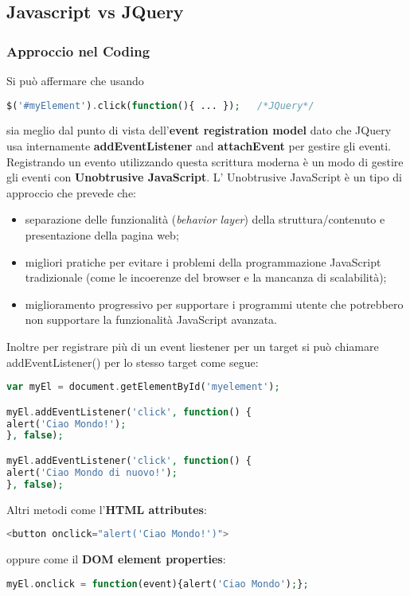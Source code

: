 \subsection{Javascript vs JQuery}

\subsubsection{Approccio nel Coding}
Si può affermare che usando 
\begin{lstlisting}[language=PHP]
$('#myElement').click(function(){ ... });	/*JQuery*/
\end{lstlisting}
sia meglio dal punto di vista dell'\textbf{event registration model} dato che JQuery usa internamente \textbf{addEventListener} and \textbf{attachEvent} per gestire gli eventi. \newline
Registrando  un evento utilizzando questa scrittura moderna è un modo di gestire gli eventi con \textbf{Unobtrusive JavaScript}. \newline
L' Unobtrusive JavaScript è un tipo di approccio che prevede che:
\begin{itemize}
\item separazione delle funzionalità (\textit{behavior layer}) della struttura/contenuto e presentazione della pagina web;
\item migliori pratiche per evitare i problemi della programmazione JavaScript tradizionale (come le incoerenze del browser e la mancanza di scalabilità);
\item miglioramento progressivo per supportare i programmi utente che potrebbero non supportare la funzionalità JavaScript avanzata.
\end{itemize}
Inoltre per registrare più di un event liestener per un target si può chiamare addEventListener() per lo stesso target come segue:
\begin{lstlisting}[language=PHP]
var myEl = document.getElementById('myelement');

myEl.addEventListener('click', function() {
alert('Ciao Mondo!');
}, false);

myEl.addEventListener('click', function() {
alert('Ciao Mondo di nuovo!');
}, false);
\end{lstlisting}

Altri metodi come l'\textbf{HTML attributes}:
\begin{lstlisting}[language=PHP]
<button onclick="alert('Ciao Mondo!')">
\end{lstlisting}
oppure come il \textbf{DOM element properties}:
\begin{lstlisting}[language=PHP]
myEl.onclick = function(event){alert('Ciao Mondo');}; 
\end{lstlisting}

